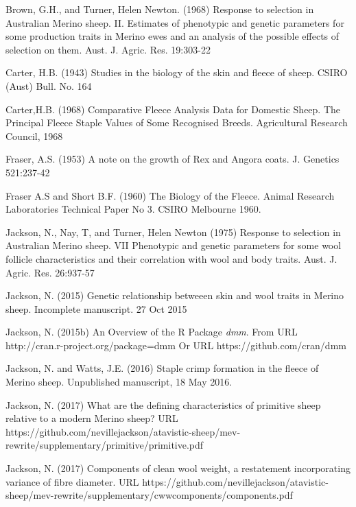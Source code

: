 \documentclass[titlepage]{article}  %
\begin{document}
\clearpage
\begin{thebibliography}{99}

Brown, G.H., and Turner, Helen Newton. (1968) Response to selection in Australian Merino sheep. II. Estimates of phenotypic and genetic parameters for some production traits in Merino ewes and an analysis of the possible effects of selection on them. Aust. J. Agric. Res. 19:303-22

Carter, H.B. (1943) Studies in the biology of the skin and fleece of sheep. CSIRO (Aust) Bull. No. 164

Carter,H.B. (1968) Comparative Fleece Analysis Data for Domestic Sheep. The Principal Fleece Staple Values of Some Recognised Breeds. Agricultural Research Council, 1968
 
Fraser, A.S. (1953) A note on the growth of Rex and Angora coats. J. Genetics 521:237-42

Fraser A.S and Short B.F. (1960) The Biology of the Fleece. Animal Research Laboratories Technical Paper No 3. CSIRO Melbourne 1960.

Jackson, N., Nay, T, and Turner, Helen Newton (1975) Response to selection in Australian Merino sheep. VII Phenotypic and genetic parameters for some wool follicle characteristics and their correlation with wool and body traits. Aust. J. Agric. Res. 26:937-57

Jackson, N. (2015) Genetic relationship betweeen skin and wool traits in Merino sheep. Incomplete manuscript. 27 Oct 2015

Jackson, N. (2015b) An Overview of the R Package {\em dmm}. From URL http://cran.r-project.org/package=dmm  Or URL https://github.com/cran/dmm

Jackson, N. and Watts, J.E. (2016) Staple crimp formation in the fleece of Merino sheep. Unpublished manuscript, 18 May 2016.

Jackson, N. (2017) What are the defining characteristics of primitive sheep relative to a modern Merino sheep? URL https://github.com/nevillejackson/atavistic-sheep/mev-rewrite/supplementary/primitive/primitive.pdf


Jackson, N. (2017) Components of clean wool weight, a restatement incorporating variance of fibre diameter. URL https://github.com/nevillejackson/atavistic-sheep/mev-rewrite/supplementary/cwwcomponents/components.pdf


\end{thebibliography}
\end{document}
